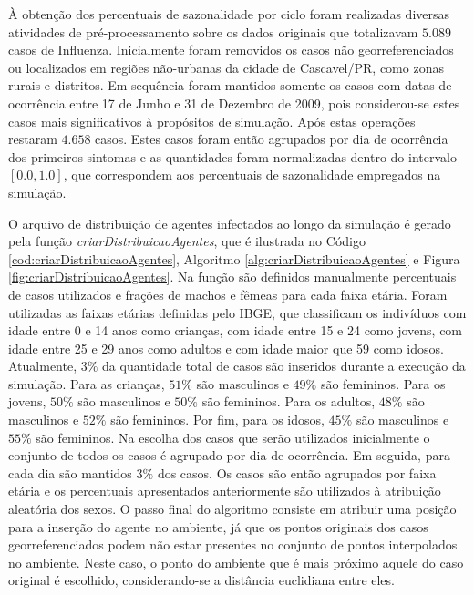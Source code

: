 À obtenção dos percentuais de sazonalidade por ciclo foram realizadas diversas atividades de pré-processamento sobre os dados originais que totalizavam $5.089$ casos de Influenza. Inicialmente foram removidos os casos não georreferenciados ou localizados em regiões não-urbanas da cidade de Cascavel/PR, como zonas rurais e distritos. Em sequência foram mantidos somente os casos com datas de ocorrência entre 17 de Junho e 31 de Dezembro de 2009, pois considerou-se estes casos mais significativos à propósitos de simulação. Após estas operações restaram $4.658$ casos. Estes casos foram então agrupados por dia de ocorrência dos primeiros sintomas e as quantidades foram normalizadas dentro do intervalo $[0.0, 1.0]$, que correspondem aos percentuais de sazonalidade empregados na simulação.

O arquivo de distribuição de agentes infectados ao longo da simulação é gerado pela função \textit{criarDistribuicaoAgentes}, que é ilustrada no Código \ref{cod:criarDistribuicaoAgentes}, Algoritmo \ref{alg:criarDistribuicaoAgentes} e Figura \ref{fig:criarDistribuicaoAgentes}. Na função são definidos manualmente percentuais de casos utilizados e frações de machos e fêmeas para cada faixa etária. Foram utilizadas as faixas etárias definidas pelo IBGE, que classificam os indivíduos com idade entre 0 e 14 anos como crianças, com idade entre 15 e 24 como jovens, com idade entre 25 e 29 anos como adultos e com idade maior que 59 como idosos. Atualmente, $3\%$ da quantidade total de casos são inseridos durante a execução da simulação. Para as crianças, $51\%$ são masculinos e $49\%$ são femininos. Para os jovens, $50\%$ são masculinos e $50\%$ são femininos. Para os adultos, $48\%$ são masculinos e $52\%$ são femininos. Por fim, para os idosos, $45\%$ são masculinos e $55\%$ são femininos. Na escolha dos casos que serão utilizados inicialmente o conjunto de todos os casos é agrupado por dia de ocorrência. Em seguida, para cada dia são mantidos $3\%$ dos casos. Os casos são então agrupados por faixa etária e os percentuais apresentados anteriormente são utilizados à atribuição aleatória dos sexos. O passo final do algoritmo consiste em atribuir uma posição para a inserção do agente no ambiente, já que os pontos originais dos casos georreferenciados podem não estar presentes no conjunto de pontos interpolados no ambiente. Neste caso, o ponto do ambiente que é mais próximo aquele do caso original é escolhido, considerando-se a distância euclidiana entre eles. 

\newpage